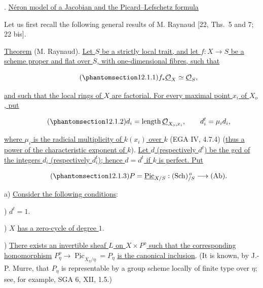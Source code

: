 \medskip
{}. \underline{N\'eron model of a Jacobian and the Picard--Lefschetz
formula}

Let us first recall the following general results of M. Raynaud
[22, Ths.~5 and 7; 22 bis].

\medskip
\noindent
\underline{Theorem}  (M. Raynaud). \underline{Let $S$ be a strictly
local trait, and let $f:X\to S$ be a scheme proper and flat over $S$, with
one-dimensional fibres, such that}

\begin{equation}\tag{\SGARefTarget{sga7.sga7i.eix.n12-1-1}{12.1.1}}
 f_*\underline{\mathcal O}_X\simeq\underline{\mathcal O}_S,
\end{equation}

\noindent
\underline{and such that the local rings of $X$ are factorial. For every
maximal point $x_i$ of $X_o$, put}

\begin{equation}\tag{\SGARefTarget{sga7.sga7i.eix.n12-1-2}{12.1.2}}
 d_i=\operatorname{length}\underline{\mathcal O}_{X_o,x_i},
 \qquad d_i^t=\mu_i d_i,
\end{equation}

\noindent
\underline{where $\mu_i$ is the radicial multiplicity of $k(x_i)$ over
$k$} (EGA IV, 4.7.4) (\underline{thus a power of the characteristic
exponent of $k$}). \underline{Let $d$ (respectively $d^t$) be the gcd of the integers
$d_i$ (respectively $d_i^t$); hence $d=d^t$ if $k$ is perfect. Put}

\begin{equation}\tag{\SGARefTarget{sga7.sga7i.eix.n12-1-3}{12.1.3}}
 P=\underline{\operatorname{Pic}}_{X/S}:
   (\operatorname{Sch})_{/S}^{\,o}\longrightarrow(\operatorname{Ab}).
\end{equation}

\noindent
a) \underline{Consider the following conditions}:

\smallskip
{}) $d^t=1$.

\smallskip
{}) $X$ \underline{has a zero-cycle of degree $1$}.

\smallskip
{}) \underline{There exists an invertible sheaf $L$ on $X\times P^o$ such
that the corresponding homomorphism}
$P^o_\eta\to\underline{\operatorname{Pic}}_{X_\eta/\eta}=P_\eta$
\underline{is the canonical inclusion}. (It is known, by J.-P. Murre,
that $P_\eta$ is representable by a group scheme locally of finite type
over $\eta$; see, for example, SGA 6, XII, 1.5.)

